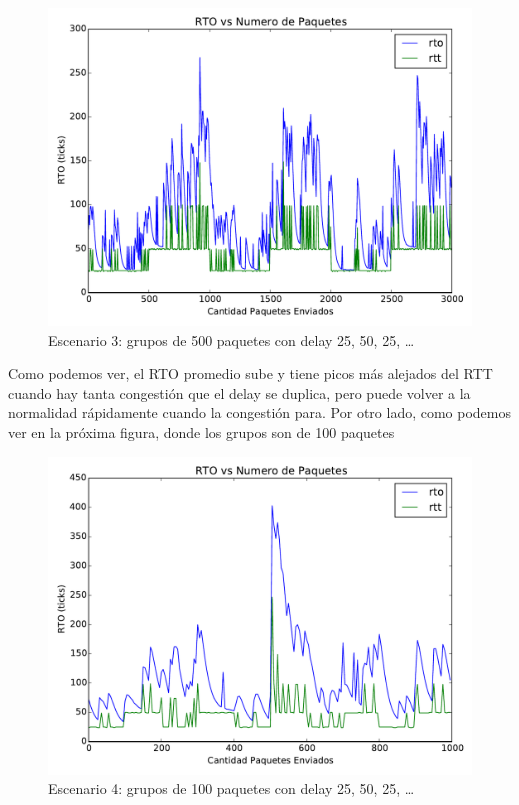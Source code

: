 		\begin{figure}[H]
			\includegraphics[width=\textwidth]{imagenes/congestion_long.pdf}
            \caption*{Escenario 3: grupos de 500 paquetes con delay 25, 50, 25, \ldots}
		\end{figure}


		Como podemos ver, el RTO promedio sube y tiene picos m\'as alejados del
		RTT cuando hay tanta congesti\'on que el delay se duplica, pero puede
		volver a la normalidad r\'apidamente cuando la congesti\'on para. Por
		otro lado, como podemos ver en la pr\'oxima figura, donde los grupos son
		de 100 paquetes

		\begin{figure}[H]
			\includegraphics[width=\textwidth]{imagenes/congestion_short.pdf}
			\caption*{Escenario 4: grupos de 100 paquetes con delay 25, 50, 25, \ldots}
		\end{figure}

